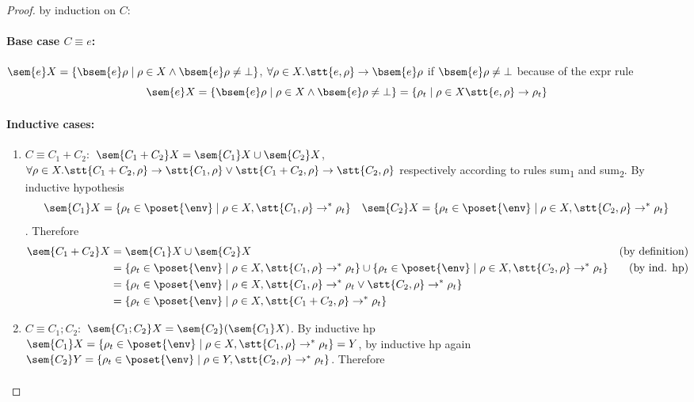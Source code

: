 \begin{proof}
  by induction on \(C\):
  \paragraph*{Base case \(C \equiv e\):\\}
  \(\sem{e}X = \{\bsem{e}\rho \mid \rho \in X \wedge \bsem{e}\rho
  \neq \bot \}\), \(\forall \rho \in X . \stt{e, \rho} \to
  \bsem{e}\rho\) if \(\bsem{e}\rho \neq \bot\) because of the expr
  rule \[\sem{e}X = \{\bsem{e}\rho \mid \rho \in X \wedge
  \bsem{e}\rho \neq \bot \} = \{\rho_t \mid \rho \in X \stt{e, \rho}
  \to \rho_t\}\]
  \paragraph*{Inductive cases:\\}
  \begin{enumerate}
  \item \(C \equiv C_1 + C_2:\) \(\sem{C_1 + C_2}X = \sem{C_1}X \cup
    \sem{C_2}X\), \(\forall \rho \in X . \stt{C_1 + C_2, \rho} \to
    \stt{C_1, \rho} \vee \stt{C_1 + C_2, \rho} \to \stt{C_2, \rho}\)
    respectively according to rules sum\textsubscript{1} and
    sum\textsubscript{2}. By inductive hypothesis \[\sem{C_1}X =
    \{\rho_t \in\poset{\env} \mid \rho \in X , \stt{C_1,\rho} \to^* \rho_t\} \quad
    \sem{C_2}X = \{\rho_t \in\poset{\env} \mid \rho \in X , \stt{C_2,\rho} \to^*
    \rho_t\}\]. Therefore
    \begin{align*}
      \sem{C_1 + C_2}X & = \sem{C_1}X \cup \sem{C_2}X & \text{(by definition)}\\
      & = \{\rho_t \in\poset{\env} \mid \rho \in X , \stt{C_1,\rho} \to^* \rho_t\} \cup \{\rho_t \in\poset{\env} \mid \rho \in X , \stt{C_2,\rho} \to^* \rho_t\} & \text{(by ind. hp)}\\
      & = \{\rho_t \in\poset{\env} \mid \rho \in X, \stt{C_1,\rho} \to^* \rho_t \vee \stt{C_2,\rho} \to^* \rho_t\} \\
      & = \{\rho_t \in\poset{\env} \mid \rho \in X, \stt{C_1 + C_2, \rho} \to^* \rho_t\}
    \end{align*}
  \item \(C \equiv C_1;C_2:\) \(\sem{C_1;C_2}X =
    \sem{C_2}(\sem{C_1}X)\). By inductive hp \(\sem{C_1}X = \{\rho_t
    \in\poset{\env} \mid \rho \in X, \stt{C_1, \rho} \to^* \rho_t\} = Y\), by inductive
    hp again \(\sem{C_2}Y = \{\rho_t \in\poset{\env} \mid \rho \in Y, \stt{C_2, \rho}
    \to^* \rho_t\}\). Therefore
    \begin{align*}

\end{align*}
\end{enumerate}
\end{proof}
